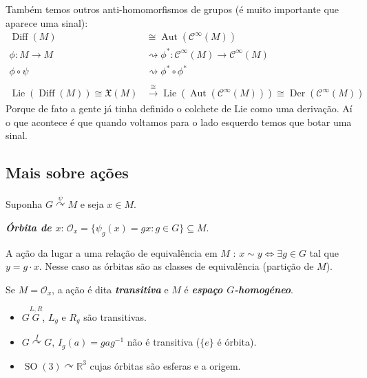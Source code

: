 Também temos outros anti-homomorfismos de grupos (é muito importante que aparece uma sinal):
\begin{align*}
	\operatorname{Diff}(M)&\cong \operatorname{Aut}(\mathcal{C}^\infty(M))\\
	\phi :M\to M&\rightsquigarrow \phi^*:\mathcal{C}^\infty(M)\to \mathcal{C}^\infty(M)\\
	\phi \circ \psi&\rightsquigarrow \phi^*\circ \phi^*\\ \\
	\operatorname{Lie}(\operatorname{Diff}(M)) \cong \mathfrak{X}(M) &\overset{\cong }{\longrightarrow}\operatorname{Lie}(\operatorname{Aut}(\mathcal{C}^\infty(M))) \cong \operatorname{Der}(\mathcal{C}^\infty(M))
\end{align*}
Porque de fato a gente já tinha definido o colchete de Lie como uma derivação. Aí o que acontece é que quando voltamos para o lado esquerdo temos que botar uma sinal.

\subsection{Mais sobre ações}

Suponha $G\overset{\psi}{\curvearrowright }M$ e seja $ x\in M$.

\begin{defn}
	\textit{\textbf{Órbita de $x$}}: $\mathcal{O}_x=\{\psi_g(x)=gx:g\in G\} \subseteq M$.
\end{defn}
		A ação da lugar a uma relação de equivalência em $M$ : $x\sim y\iff \exists g\in G$ tal que $y=g\cdot x$. Nesse caso as órbitas são as classes de equivalência (partição de $M$).

\begin{remark}
	Se $M=\mathcal{O}_x$, a ação é dita \textit{\textbf{transitiva}} e  $M$ é \textit{\textbf{espaço $G$-homogéneo}}.
\end{remark}

\begin{example}\leavevmode
	\begin{itemize}
	\item $G\overset{L,R}{G}$, $L_g$ e  $R_g$ são transitivas.
	\item $G\overset{I}{\curvearrowright}G$, $I_g(a)=gag^{-1}$ não é transitiva ($\{e\}$ é órbita).
	\item $\operatorname{SO}(3) \curvearrowright \mathbb{R}^3$ cujas órbitas são esferas e a origem.
	\end{itemize}
\end{example}

